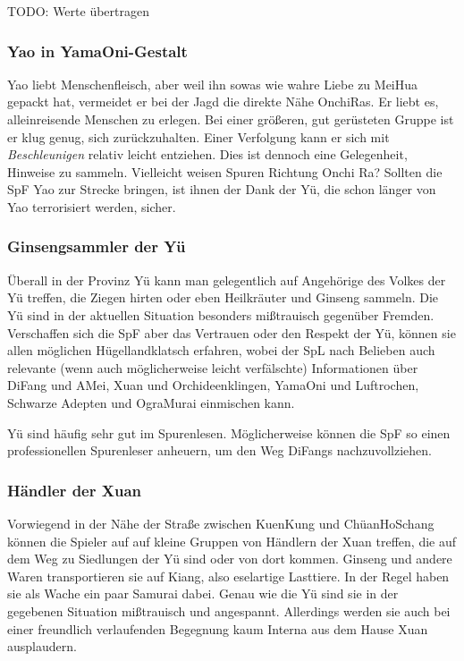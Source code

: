 \documentclass[
a4paper,
twoside,
DIV=calc,
BCOR=4mm,
fontsize=9pt,
twocolumn=on,
titlepage=on,
parskip=half
]{scrartcl}
\begin{document}
TODO: Werte übertragen

\subsubsection{Yao in YamaOni-Gestalt}

Yao liebt Menschenfleisch, aber weil ihn sowas wie wahre Liebe zu
MeiHua gepackt hat, vermeidet er bei der Jagd die direkte Nähe
OnchiRas. Er liebt es, alleinreisende Menschen zu erlegen. Bei einer
größeren, gut gerüsteten Gruppe ist er klug genug, sich
zurückzuhalten. Einer Verfolgung kann er sich mit \emph{Beschleunigen}
relativ leicht entziehen. Dies ist dennoch eine Gelegenheit, Hinweise
zu sammeln. Vielleicht weisen Spuren Richtung Onchi Ra? Sollten die
SpF Yao zur Strecke bringen, ist ihnen der Dank der Yü, die schon
länger von Yao terrorisiert werden, sicher.

\subsubsection{Ginsengsammler der Yü}

Überall in der Provinz Yü kann man gelegentlich auf Angehörige des
Volkes der Yü treffen, die Ziegen hirten oder eben Heilkräuter und
Ginseng sammeln. Die Yü sind in der aktuellen Situation besonders
mißtrauisch gegenüber Fremden. Verschaffen sich die SpF aber das
Vertrauen oder den Respekt der Yü, können sie allen möglichen
Hügellandklatsch erfahren, wobei der SpL nach Belieben auch relevante
(wenn auch möglicherweise leicht verfälschte) Informationen über
DiFang und AMei, Xuan und Orchideenklingen, YamaOni und Luftrochen,
Schwarze Adepten und OgraMurai einmischen kann.

Yü sind häufig sehr gut im Spurenlesen. Möglicherweise können die SpF
so einen professionellen Spurenleser anheuern, um den Weg DiFangs
nachzuvollziehen.

\subsubsection{Händler der Xuan}

Vorwiegend in der Nähe der Straße zwischen KuenKung und ChüanHoSchang
können die Spieler auf auf kleine Gruppen von Händlern der Xuan
treffen, die auf dem Weg zu Siedlungen der Yü sind oder von dort
kommen. Ginseng und andere Waren transportieren sie auf Kiang, also
eselartige Lasttiere. In der Regel haben sie als Wache ein paar
Samurai dabei. Genau wie die Yü sind sie in der gegebenen Situation
mißtrauisch und angespannt. Allerdings werden sie auch bei einer
freundlich verlaufenden Begegnung kaum Interna aus dem Hause Xuan
ausplaudern.
\end{document}
